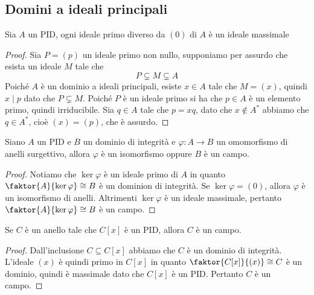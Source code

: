 \documentclass[11pt]{scrartcl}
\begin{document}
	\newpage
	
	\subsection{Domini a ideali principali}
	
	\begin{proposition}
		Sia $A$ un PID, ogni ideale primo diverso da $(0)$ di $A$ è un ideale 
		massimale
	\end{proposition}
	
	\begin{proof}
		Sia $P = (p)$ un ideale primo non nullo, supponiamo per assurdo che esista
		un ideale $M$ tale che 
		\[
		P \subsetneq M \subsetneq A
		\]
		Poiché $A$ è un dominio a ideali principali, esiste $x \in A$ tale che 
		$M = (x)$, quindi $x \mid p$ dato che $P \subsetneq M$. Poiché $P$ è 
		un ideale primo si ha che $p \in A$ è un elemento primo, quindi 
		irriducibile. Sia $q \in A$ tale che $p = xq$, dato che $x \notin A^*$ abbiamo che 
		$q \in A^*$, cioè $(x) = (p)$, che è assurdo.
	\end{proof}
	
	\begin{corollary}
		Siano $A$ un PID e $B$ un dominio di integrità e $\varphi: A \longrightarrow B$
		un omomorfismo di anelli surgettivo, allora $\varphi$ è un isomorfismo
		oppure $B$ è un campo. 
	\end{corollary}
	
	\begin{proof}
		Notiamo che $\ker \varphi$ è un ideale primo di $A$ in quanto $\faktor{A}{\ker\varphi}
		\cong B$ è un dominion di integrità. Se $\ker\varphi = (0)$, allora 
		$\varphi$ è un isomorfismo di anelli. Altrimenti $\ker\varphi$ è un ideale
		massimale, pertanto $\faktor{A}{\ker\varphi}\cong B$ è un campo.
	\end{proof}
	
	\begin{corollary}
		Se $C$ è un anello tale che $C[x]$ è un PID, allora $C$ è un campo.
	\end{corollary}
	
	\begin{proof}
		Dall'inclusione $C \subseteq C[x]$ abbiamo che $C$ è un dominio di integrità.
		L'ideale $(x)$ è quindi primo in $C[x]$ in quanto $\faktor{C[x]}{(x)} \cong C$
		è un dominio, quindi è massimale dato che $C[x]$ è un PID. Pertanto 
		$C$ è un campo.
	\end{proof}
	
\end{document}
